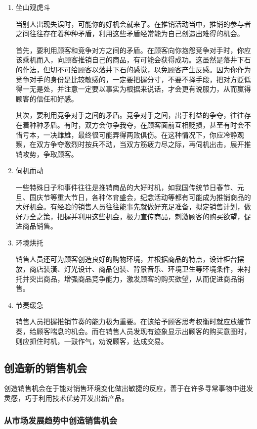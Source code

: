 \begin{enumerate}
    \item 坐山观虎斗

    当别人出现失误时，可能你的好机会就来了。在推销活动当中，推销的参与者之间往往存在着种种矛盾，利用这些矛盾经常能为自己创造出难得的机会。

    首先，要利用顾客和竞争对方之间的矛盾。在顾客向你抱怨竞争对手时，你应该乘机而入，向顾客推销自己的商品，有可能会获得成功。这虽然是落井下石的作法，但切不可给顾客以落井下石的感觉，以免顾客产生反感。因为你作为竞争对手的身份是比较敏感的，一定要把握分寸，不要不择手段，把对方贬低得一无是处，并注意一定要以事实为根据来说话，才会更有说服力，从而赢得顾客的信任和好感。

    其次，要利用竞争对手之间的矛盾。竞争对手之间，出于利益的争夺，往往存在着种种矛盾。有时，双方会你争我夺，在顾客面前互相贬损，甚至有时会不惜亏本，一决雌雄，最终很可能弄得两败俱伤。在这种情况下，你应冷静观察，在双方争夺激烈时按兵不动，当双方筋疲力尽之际，再伺机出击，展开推销攻势，争取顾客。

    \item 伺机而动

    一些特殊日子和事件往往是推销商品的大好时机，如我国传统节日春节、元旦、国庆节等重大节日，各种体育盛会，纪念活动等都有可能成为推销商品的大好机会。有经验的销售人员往往能事先就做好充足准备，拟定销售计划，做好万全之策，把握并利用这些机会，极力宣传商品，刺激顾客的购买欲望，促进商品销售。

    \item 环境烘托

    销售人员还可为顾客创造良好的购物环境，并根据商品的特点，设计柜台摆放，商店装潢、灯光设计、商品包装、背景音乐、环境卫生等环境条件，来衬托并突出商品，增强商品竞争能力，激发顾客的购买欲望，从而促进商品销售。

    \item 节奏缓急

    销售人员把握推销节奏的能力极为重要。在该给予顾客思考权衡时就应放缓节奏，给顾客喘息的机会。而在销售人员发现有迹象显示出顾客的购买意图时，则应抓住时机，一鼓作气，劝说顾客，达成交易。

    \end{enumerate}

\subsection {创造新的销售机会}
    创造销售机会在于能对销售环境变化做出敏捷的反应，善于在许多寻常事物中迸发灵感，巧于利用技术优势开发出新产品。

    \subsubsection {从市场发展趋势中创造销售机会}

